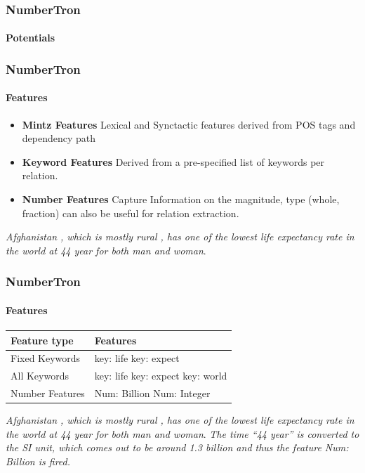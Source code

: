 \documentclass{beamer}
\begin{document}
\begin{frame}
\frametitle{NumberTron}
\framesubtitle{Potentials}
\end{frame}


\begin{frame}
\frametitle{NumberTron}
\framesubtitle{Features}
\begin{itemize}
\setlength \itemsep{2em}
\item \textbf{Mintz Features} Lexical and Synctactic features derived from POS tags and dependency path \cite{mintz}
\item \textbf{Keyword Features}
Derived from a pre-specified list of keywords per relation.
\item \textbf{Number Features} Capture Information on the magnitude, type (whole, fraction) can also be useful for relation extraction.
\end{itemize}

{\color{red}\emph{Afghanistan , which is mostly rural , has one of the lowest life expectancy rate in the world at 44 year for both man and woman}}. 

\end{frame}

\begin{frame}
\frametitle{NumberTron}
\framesubtitle{Features}
\begin{table}
\begin{tabular}{|l|l|}
\hline
Feature type & Features \\
\hline
Fixed Keywords & key: life	key: expect \\
\hline
All Keywords & key: life	key: expect	key: world \\
\hline
Number Features & Num: Billion	Num: Integer \\
\hline
\end{tabular} \end{table}
  
{\color{red}\emph{Afghanistan , which is mostly rural , has one of the lowest life expectancy rate in the world at 44 year for both man and woman}}. 
\textit{The time ``44 year'' is converted to the SI unit, which comes out to be around 1.3 billion and thus the feature Num: Billion is fired.}

\end{frame}
\end{document}
